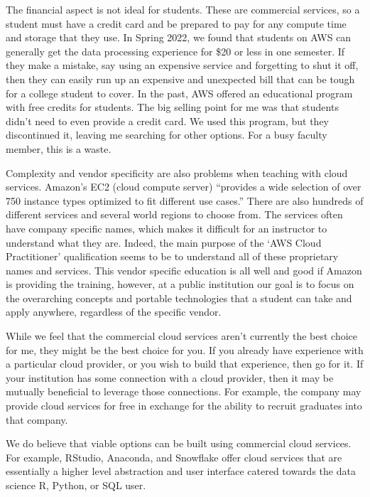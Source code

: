 \documentclass[12pt]{article}
\begin{document}
The financial aspect is not ideal for students.
These are commercial services, so a student must have a credit card and be prepared to pay for any compute time and storage that they use.
In Spring 2022, we found that students on AWS can generally get the data processing experience for \$20 or less in one semester.
If they make a mistake, say using an expensive service and forgetting to shut it off, then they can easily run up an expensive and unexpected bill that can be tough for a college student to cover.
In the past, AWS offered an educational program with free credits for students.
The big selling point for me was that students didn't need to even provide a credit card.
We used this program, but they discontinued it, leaving me searching for other options.
For a busy faculty member, this is a waste.

Complexity and vendor specificity are also problems when teaching with cloud services.
Amazon's EC2 (cloud compute server) ``provides a wide selection of over 750 instance types optimized to fit different use cases.''
There are also hundreds of different services and several world regions to choose from.
The services often have company specific names, which makes it difficult for an instructor to understand what they are.
Indeed, the main purpose of the `AWS Cloud Practitioner' qualification seems to be to understand all of these proprietary names and services.
This vendor specific education is all well and good if Amazon is providing the training, however, at a public institution our goal is to focus on the overarching concepts and portable technologies that a student can take and apply anywhere, regardless of the specific vendor.

While we feel that the commercial cloud services aren't currently the best choice for me, they might be the best choice for you.
If you already have experience with a particular cloud provider, or you wish to build that experience, then go for it.
If your institution has some connection with a cloud provider, then it may be mutually beneficial to leverage those connections.
For example, the company may provide cloud services for free in exchange for the ability to recruit graduates into that company.

We do believe that viable options can be built using commercial cloud services.
For example, RStudio, Anaconda, and Snowflake offer cloud services that are essentially a higher level abstraction and user interface catered towards the data science R, Python, or SQL user.
\end{document}
